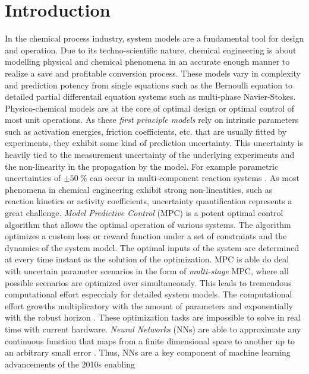 \chapter{Introduction}\label{intro} 

In the chemical process industry, system models are a fundamental tool for design and operation. Due to its
techno-scientific nature, chemical engineering is about modelling physical and chemical phenomena in an
accurate enough manner to realize a save and profitable conversion process. These models vary in complexity and 
prediction potency from single equations such as the Bernoulli equation to detailed partial differentail equation systems
such as multi-phase Navier-Stokes. Physico-chemical models are at the core of optimal design or optimal control
of most unit operations.
\newline
As these \emph{first principle models} rely on intrinsic parameters such as activation energies, friction coefficients, etc.
that are usually fitted by experiments, they exhibit some kind of prediction uncertainty. This uncertainty is 
heavily tied to the measurement uncertainty of the underlying experiments and the non-linearity in the propagation by the model. 
For example parametric uncertainties of $ \pm 50~\%$ can occur in multi-component reaction systems \cite{empty000}.
As most phenomena in chemical engineering exhibit strong non-lineatities, such as reaction kinetics or activity coefficients,
uncertainty quantification represents a great challenge. 
\newline
\emph{Model Predictive Control} (MPC) is a potent optimal control algorithm that allows the optimal operation of various systems. 
The algorithm optimizes a custom loss or reward function under a set of constraints and the dynamics of the system model. The optimal inputs
of the system are determined at every time instant as the solution of the optimization. MPC is able do deal with uncertain parameter
scenarios in the form of \emph{multi-stage} MPC, where all possible scenarios are optimized over simultaneously. This leads
to tremendous computational effort especcialy for detailed system models. The computational effort growths multiplicatory with the 
amount of parameters and exponentially with the robust horizon \cite{empty000}. These optimization tasks are impossible to solve
in real time with current hardware.
\newline
\emph{Neural Networks} (NNs) are able to approximate any continuous function that maps from a finite dimensional space to
another up to an arbitrary small error \cite{empty000}. Thus, NNs are a key component of machine learning advancements of the 2010s enabling

